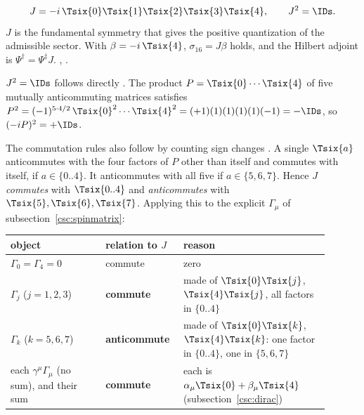 \label{sec:3.8.12.6}

\begin{equation}
  J=-i\,\Tsix{0}\Tsix{1}\Tsix{2}\Tsix{3}\Tsix{4},\qquad J^2=\IDs .
\end{equation}
$J$ is the fundamental symmetry that gives the positive quantization of the admissible sector.
With $\beta=-i\,\Tsix{4}$, $\sigma_{16}=J\beta$ holds, and the Hilbert adjoint is
$\Psi^\dagger=\Psi^\ddagger J$.  , .

$J^2=\IDs$ follows directly \cfderived. The product $P=\Tsix{0}\cdots\Tsix{4}$ of five mutually
anticommuting matrices satisfies
$P^2=(-1)^{5\cdot4/2}\,\Tsix{0}^2\cdots\Tsix{4}^2=(+1)(1)(1)(1)(1)(-1)=-\IDs$, so
$(-iP)^2=+\IDs$.

The commutation rules also follow by counting sign changes \cfderived. A single $\Tsix{a}$
anticommutes with the four factors of $P$ other than itself and commutes with itself, if
$a\in\{0..4\}$. It anticommutes with all five if $a\in\{5,6,7\}$. Hence $J$ \emph{commutes} with
$\Tsix{0..4}$ and \emph{anticommutes} with $\Tsix{5},\Tsix{6},\Tsix{7}$. Applying this to the
explicit $\Gamma_\mu$ of subsection~\ref{csc:spinmatrix}:

\begin{center}
{\small
\begin{tabular}{@{}p{0.28\linewidth}p{0.19\linewidth}p{0.43\linewidth}@{}}
\toprule
\raggedright object & \raggedright relation to $J$ & \raggedright reason \tabularnewline
\midrule
\raggedright $\Gamma_0=\Gamma_4=0$ & \raggedright commute & \raggedright zero \tabularnewline
\raggedright $\Gamma_j$ ($j=1,2,3$) & \raggedright \textbf{commute} & \raggedright made of $\Tsix{0}\Tsix{j}$, $\Tsix{4}\Tsix{j}$, all factors in $\{0..4\}$ \tabularnewline
\raggedright $\Gamma_k$ ($k=5,6,7$) & \raggedright \textbf{anticommute} & \raggedright made of $\Tsix{0}\Tsix{k}$, $\Tsix{4}\Tsix{k}$: one factor in $\{0..4\}$, one in $\{5,6,7\}$ \tabularnewline
\raggedright each $\gamma^\mu\Gamma_\mu$ (no sum), and their sum & \raggedright \textbf{commute} & \raggedright each is $\alpha_\mu\Tsix{0}+\beta_\mu\Tsix{4}$ (subsection~\ref{csc:dirac}) \tabularnewline
\bottomrule
\end{tabular}
}
\end{center}

